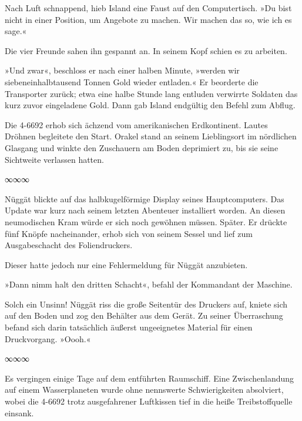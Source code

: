 Nach Luft schnappend, hieb Island eine Faust auf den Computertisch. »Du bist nicht in einer Position, um Angebote zu machen. Wir machen das so, wie ich es sage.«

Die vier Freunde sahen ihn gespannt an. In seinem Kopf schien es zu arbeiten.

»Und zwar«, beschloss er nach einer halben Minute, »werden wir siebeneinhalbtausend Tonnen Gold wieder entladen.« Er beorderte die Transporter zurück; etwa eine halbe Stunde lang entluden verwirrte Soldaten das kurz zuvor eingeladene Gold. Dann gab Island endgültig den Befehl zum Abflug.

Die 4-6692 erhob sich ächzend vom amerikanischen Erdkontinent. Lautes Dröhnen begleitete den Start. Orakel stand an seinem Lieblingsort im nördlichen Glasgang und winkte den Zuschauern am Boden deprimiert zu, bis sie seine Sichtweite verlassen hatten.

\begin{center}
∞∞∞
\end{center}

Nüggät blickte auf das halbkugelförmige Display seines Hauptcomputers. Das Update war kurz nach seinem letzten Abenteuer installiert worden. An diesen neumodischen Kram würde er sich noch gewöhnen müssen. Später. Er drückte fünf Knöpfe nacheinander, erhob sich von seinem Sessel und lief zum Ausgabeschacht des Foliendruckers.

Dieser hatte jedoch nur eine Fehlermeldung für Nüggät anzubieten. 

»Dann nimm halt den dritten Schacht«, befahl der Kommandant der Maschine.


Solch ein Unsinn! Nüggät riss die große Seitentür des Druckers auf, kniete sich auf den Boden und zog den Behälter aus dem Gerät. Zu seiner Überraschung befand sich darin tatsächlich äußerst ungeeignetes Material für einen Druckvorgang. »Oooh.«

\begin{center}
∞∞∞
\end{center}

Es vergingen einige Tage auf dem entführten Raumschiff. Eine Zwischenlandung auf einem Wasserplaneten wurde ohne nennswerte Schwierigkeiten absolviert, wobei die 4-6692 trotz ausgefahrener Luftkissen tief in die heiße Treibstoffquelle einsank.

